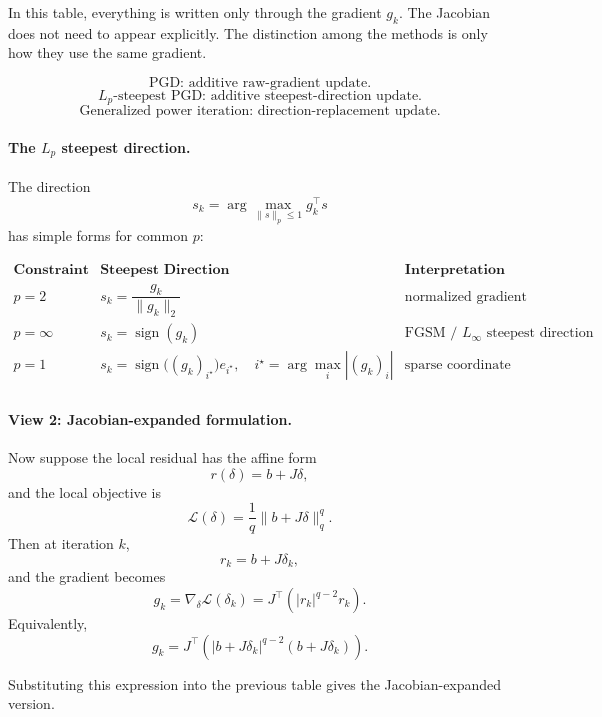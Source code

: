 \documentclass{article}
\begin{document}
In this table, everything is written only through the gradient $g_k$.
The Jacobian does not need to appear explicitly.
The distinction among the methods is only how they use the same gradient.

\[
\text{PGD: additive raw-gradient update.}
\]
\[
L_p\text{-steepest PGD: additive steepest-direction update.}
\]
\[
\text{Generalized power iteration: direction-replacement update.}
\]

\paragraph{The $L_p$ steepest direction.}
The direction
\[
s_k=
\arg\max_{\|s\|_p\le1}g_k^\top s
\]
has simple forms for common $p$:

\[
\begin{array}{c|c|c}
\textbf{Constraint}
&
\textbf{Steepest Direction}
&
\textbf{Interpretation}
\\
\hline
p=2
&
s_k=\dfrac{g_k}{\|g_k\|_2}
&
\text{normalized gradient direction}
\\
\hline
p=\infty
&
s_k=\operatorname{sign}(g_k)
&
\text{FGSM / } L_\infty \text{ steepest direction}
\\
\hline
p=1
&
s_k=
\operatorname{sign}\bigl((g_k)_{i^\star}\bigr)e_{i^\star},
\quad
i^\star=\arg\max_i |(g_k)_i|
&
\text{sparse coordinate direction}
\\
\end{array}
\]

\paragraph{View 2: Jacobian-expanded formulation.}
Now suppose the local residual has the affine form
\[
r(\delta)=b+J\delta,
\]
and the local objective is
\[
\mathcal L(\delta)
=
\frac{1}{q}\|b+J\delta\|_q^q.
\]
Then at iteration $k$,
\[
r_k=b+J\delta_k,
\]
and the gradient becomes
\[
g_k
=
\nabla_\delta \mathcal L(\delta_k)
=
J^\top\left(|r_k|^{q-2}r_k\right).
\]
Equivalently,
\[
g_k
=
J^\top
\left(
|b+J\delta_k|^{q-2}
(b+J\delta_k)
\right).
\]

Substituting this expression into the previous table gives the Jacobian-expanded version.
\end{document}
